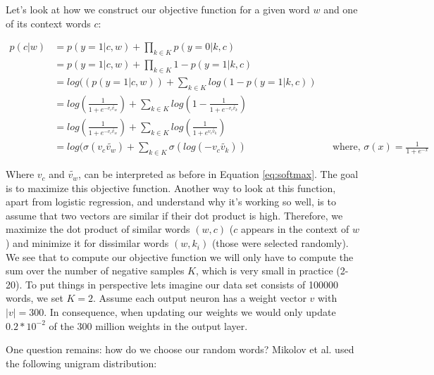 Let's look at how we construct our objective function for a given word $w$ and one of its context words $c$:

\begin{align*}
p(c|w) &= p(y=1|c,w) + \prod_{k\in K} p(y=0|k,c)
\\&= p(y=1|c,w) + \prod_{k\in K} 1- p(y=1|k,c)
\\&= log((p(y=1|c,w)) + \sum_{k\in K} log(1- p(y=1|k,c))
\\&= log(\frac{1}{1+e^{-v_c \tilde{v_w }}}) + \sum_{k\in K} log(1-\frac{1}{1+e^{-v_c \tilde{v_k}}})
\\&= log(\frac{1}{1+e^{-v_c \tilde{v_w } }}) + \sum_{k\in K} log(\frac{1}{1+e^{v_c \tilde{v_k} }})
\\&= log(\sigma(v_c \tilde{v_w } ) + \sum_{k\in K} \sigma(log(-v_c \tilde{v_k} )) &&\text{where, $\sigma(x) = \frac{1}{1+e^{-x}}$}
\end{align*}\label{eq:obj_neg_samples}

Where $v_c$ and $\tilde{v_w }$, can be interpreted as before in Equation \ref{eq:softmax}. The goal is to maximize this objective function. Another way to look at this function, apart from logistic regression, and understand why it's working so well, is to assume that two vectors are similar if their dot product is high. Therefore, we maximize the dot product of similar words $(w,c)$ ($c$ appears in the context of $w$) and minimize it for dissimilar words $(w,k_i)$ (those were selected randomly).
We see that to compute our objective function we will only have to compute the sum over the number of negative samples $K$, which is very small in practice (2-20). To put things in perspective lets imagine our data set consists of 100000 words, we set $K=2$. Assume each output neuron has a weight vector $v$ with $|v| = 300$. In consequence, when updating our weights we would only update $0.2*10^{-2}$ of the 300 million weights in the output layer.

One question remains: how do we choose our random words? Mikolov et al. \cite{mikolov2} used the following unigram distribution:

